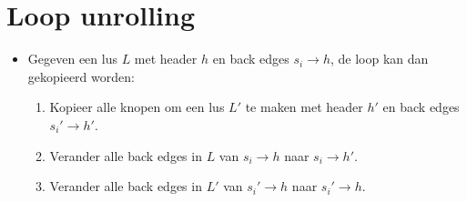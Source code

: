 \section{Loop unrolling}
\begin{itemize}
	\item Gegeven een lus $L$ met header $h$ en back edges $s_i \rightarrow h$, de loop kan dan gekopieerd worden:
	\begin{enumerate}
		\item Kopieer alle knopen om een lus $L'$ te maken met header $h'$ en back edges $s_i' \rightarrow h'$.
		\item Verander alle back edges in $L$ van $s_i \rightarrow h$ naar $s_i \rightarrow h'$.
		\item Verander alle back edges in $L'$ van $s_i' \rightarrow h$ naar $s_i' \rightarrow h$.
	\end{enumerate}
\end{itemize}